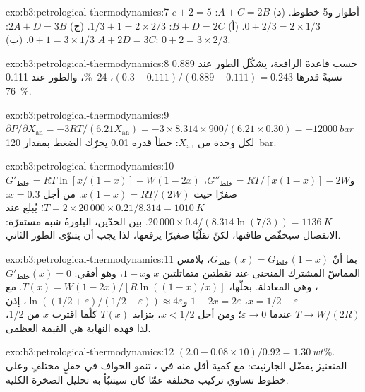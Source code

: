 \begin{solution}{exo:b3:petrological-thermodynamics:7}
$c + 2 = 5$ أطوار و5 خطوط. (د) $A + C = 2B$: $0 + 2/3 = 2\times1/3$. (أ)
$B + D = 2C$: $1/3 + 1 = 2\times2/3$. (ج) $2A + D = 3B$: $0 + 1 = 3\times1/3$.
(ب) $A + 2D = 3C$: $0 + 2 = 3\times2/3$.
\end{solution}

\begin{solution}{exo:b3:petrological-thermodynamics:8}
حسب قاعدة الرافعة، يشكّل الطور عند 0.889 نسبةً قدرها $(0.3 - 0.111)/(0.889 - 0.111) =
0.243$، \qty{24}{\percent}، والطور عند 0.111 \qty{76}{\percent}.
\end{solution}

\begin{solution}{exo:b3:petrological-thermodynamics:9}
$\partial P/\partial X_{\text{an}} = -3RT/(6.21X_{\text{an}}) =
-3\times8.314\times900/(6.21\times0.30) = \qty{-12000}{bar}$ لكل وحدة من
$X_{\text{an}}$: خطأ قدره 0.01 يحرّك الضغط بمقدار \qty{120}{bar}.
\end{solution}

\begin{solution}{exo:b3:petrological-thermodynamics:10}
$G'_{\text{خلط}} = RT\ln[x/(1 - x)] + W(1 - 2x)$ و$G''_{\text{خلط}} =
RT/[x(1 - x)] - 2W$، صفرًا حيث $x(1 - x) = RT/(2W)$. من أجل $x = 0.3$: $T =
2\times20\,000\times0.21/8.314 = \qty{1010}{K}$؛ يُبلغ  عند
$20\,000\times0.4/(8.314\ln(7/3)) = \qty{1136}{K}$. بين الحدّين، البلورةُ
شبه مستقرّة: الانفصال سيخفّض طاقتها، لكنّ تقلّبًا صغيرًا
يرفعها، لذا يجب أن يتنوّى الطور الثاني.
\end{solution}

\begin{solution}{exo:b3:petrological-thermodynamics:11}
بما أنّ $G_{\text{خلط}}(x) = G_{\text{خلط}}(1 - x)$، يلامس المماسّ المشترك
المنحنى عند نقطتين متماثلتين $x$ و$1 - x$، وهو أفقي:
$G'_{\text{خلط}}(x) = 0$، وهي المعادلة. بحلّها، $T(x) = W(1 -
2x)/[R\ln((1 - x)/x)]$. مع $x = 1/2 - \varepsilon$، $1 - 2x = 2\varepsilon$
و$\ln((1/2 + \varepsilon)/(1/2 - \varepsilon)) \approx 4\varepsilon$، إذن
$T \to W/(2R)$ عندما $\varepsilon \to 0$؛ ومن أجل $x < 1/2$، يتزايد $T(x)$ كلّما اقترب $x$
من 1/2، لذا فهذه النهاية هي القيمة العظمى.
\end{solution}

\begin{solution}{exo:b3:petrological-thermodynamics:12}
$(2.0 - 0.08\times10)/0.92 = \qty{1.30}{wt\percent}$. المنغنيز يفضّل
الجارنيت: مع كمية أقل منه في ، تنمو الحواف في
حقلٍ مختلفٍ وعلى خطوط تساوي تركيب مختلفة عمّا
كان سيتنبّأ به تحليل الصخرة الكلية.
\end{solution}

